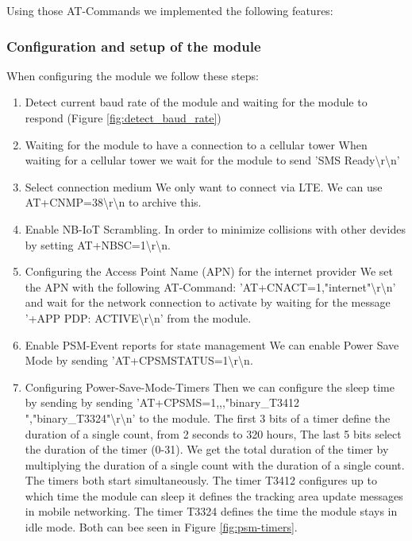Using those AT-Commands we implemented the following features:

\subsubsection{Configuration and setup of the module}
When configuring the module we follow these steps:
\begin{enumerate}
    \item Detect current baud rate of the module and waiting for the module to respond (Figure \ref{fig:detect_baud_rate})
    \item Waiting for the module to have a connection to a cellular tower
\newline{}When waiting for a cellular tower we wait for the module to send 'SMS Ready\textbackslash{}r\textbackslash{}n' 
\item Select connection medium \newline{} We only want to connect via LTE. We can use AT+CNMP=38\textbackslash{}r\textbackslash{}n to archive this.
    \item  Enable NB-IoT Scrambling. \newline{}In order to minimize collisions with other devides by setting AT+NBSC=1\textbackslash{}r\textbackslash{}n.
    \item Configuring the Access Point Name (APN) for the internet provider
\newline{}We set the APN with the following AT-Command: 'AT+CNACT=1,"internet"\textbackslash{}r\textbackslash{}n' and wait for the network connection to activate by waiting for the message '+APP PDP: ACTIVE\textbackslash{}r\textbackslash{}n' from the module.
    \item Enable PSM-Event reports for state management
\newline{}We can enable Power Save Mode by sending 'AT+CPSMSTATUS=1\textbackslash{}r\textbackslash{}n.
    \item Configuring Power-Save-Mode-Timers 
\newline{}Then we can configure the sleep time by sending by sending \newline{} 'AT+CPSMS=1,,,"binary\_T3412 ","binary\_T3324"\textbackslash{}r\textbackslash{}n'  to the module. The first 3 bits of a timer define the duration of a single count, from 2 seconds to 320 hours, The last 5 bits select the duration of the timer (0-31). We get the total duration of the timer by multiplying the duration of a single count with the duration of a single count. The timers both start simultaneously. The timer T3412 configures up to which time the module can sleep it defines the tracking area update messages in mobile networking. The timer T3324 defines the time the module stays in idle mode. Both can bee seen in Figure \ref{fig:psm-timers}.

\end{enumerate}
